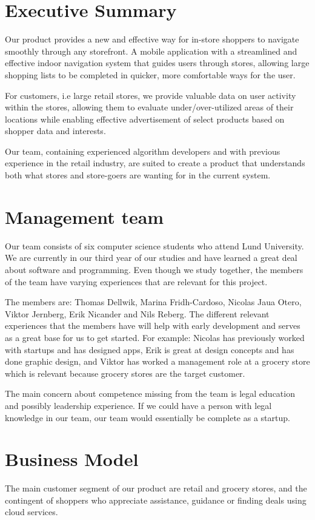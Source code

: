 \documentclass[titlepage]{article}
\begin{document}
\section{Executive Summary}
Our product provides a new and effective way for in-store shoppers to navigate smoothly through any storefront. A mobile application with a streamlined and effective indoor navigation system that guides users through stores, allowing large shopping lists to be completed in quicker, more comfortable ways for the user. 

For customers, i.e large retail stores, we provide valuable data on user activity within the stores, allowing them to evaluate under/over-utilized areas of their locations while enabling effective advertisement of select products based on shopper data and interests. 

Our team, containing experienced algorithm developers and with previous experience in the retail industry, are suited to create a product that understands both what stores and store-goers are wanting for in the current system.

\section{Management team}
Our team consists of six computer science students who attend Lund University. We are currently in our third year of our studies and have learned a great deal about software and programming. Even though we study together, the members of the team have varying experiences that are relevant for this project.

The members are: Thomas Dellwik, Marina Fridh-Cardoso, Nicolas Jaua Otero, Viktor Jernberg, Erik Nicander and Nils Reberg. The different relevant experiences that the members have will help with early development and serves as a great base for us to get started. For example: Nicolas has previously worked with startups and has designed apps, Erik is great at design concepts and has done graphic design, and Viktor has worked a management role at a grocery store which is relevant because grocery stores are the target customer.

The main concern about competence missing from the team  is legal education and possibly leadership experience. If we could have a person with legal knowledge in our team, our team would essentially be complete as a startup.

\section{Business Model}
The main customer segment of our product are retail and grocery stores, and the contingent of shoppers who appreciate assistance, 
guidance or finding deals using cloud services. 
\end{document}
